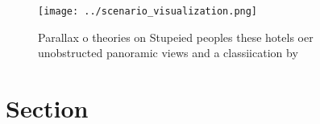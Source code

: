 \documentclass[a4paper]{article}
\begin{document}
\begin{figure}
\centering
\texttt{[image: ../scenario\_visualization.png]}
\caption{Parallax o theories on Stupeied peoples these hotels oer unobstructed panoramic views and a classiication by 
}
\end{figure}
 
\section{Section}
\end{document}
